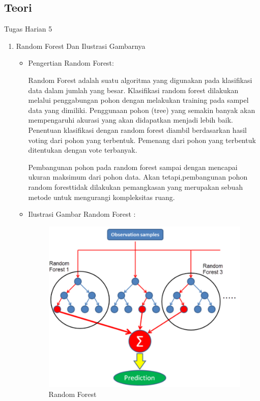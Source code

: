 \subsection{Teori}
Tugas Harian 5 
\begin{enumerate}
\item Random Forest Dan Ilustrasi Gambarnya
\begin{itemize}
\item Pengertian Random Forest:
\par Random Forest adalah suatu algoritma yang digunakan pada klasifikasi data dalam jumlah yang besar. Klasifikasi random forest dilakukan melalui penggabungan pohon  dengan melakukan training pada sampel data yang dimiliki. Penggunaan pohon (tree) yang semakin banyak akan mempengaruhi akurasi yang akan didapatkan menjadi lebih baik. Penentuan klasifikasi dengan random forest diambil berdasarkan hasil voting dari pohon yang terbentuk. Pemenang dari pohon yang terbentuk ditentukan dengan vote terbanyak. 
\par Pembangunan pohon  pada random forest sampai dengan mencapai ukuran maksimum dari pohon data. Akan tetapi,pembangunan pohon random foresttidak dilakukan pemangkasan  yang merupakan sebuah metode untuk mengurangi kompleksitas ruang.
\item Ilustrasi Gambar Random Forest :
\par

\begin{figure}[!hbtp]
\centering
\includegraphics[scale=0.9]{figures/AIP/asm1.PNG}
\caption{Random Forest}
\label{contoh}
\end{figure}


\end{itemize}
\end{enumerate}
